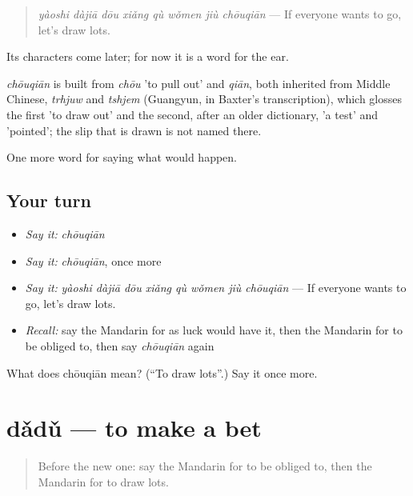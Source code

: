 \begin{quote}
\emph{yàoshi dàjiā dōu xiǎng qù wǒmen jiù chōuqiān} — If everyone wants to go, let's draw lots.
\end{quote}

Its characters come later; for now it is a word for the ear.

\begin{cousinweb}
\emph{chōuqiān} is built from \emph{chōu} 'to pull out' and \emph{qiān}, both inherited from Middle Chinese, \emph{trhjuw} and \emph{tshjem} (Guangyun, in Baxter's transcription), which glosses the first 'to draw out' and the second, after an older dictionary, 'a test' and 'pointed'; the slip that is drawn is not named there.
\end{cousinweb}

\begin{grammarlens}[title={What you've built}]
One more word for saying what would happen.
\end{grammarlens}

\subsection*{Your turn}
\begin{itemize}
\raggedright
  \item \emph{Say it:} \emph{chōuqiān}
  \item \emph{Say it:} \emph{chōuqiān}, once more
  \item \emph{Say it:} \emph{yàoshi dàjiā dōu xiǎng qù wǒmen jiù chōuqiān} — If everyone wants to go, let's draw lots.
  \item \emph{Recall:} say the Mandarin for as luck would have it, then the Mandarin for to be obliged to, then say \emph{chōuqiān} again
\end{itemize}

\begin{tcolorbox}[breakable,colback=teal!4,colframe=teal!35!black,title={Before you move on}]
What does chōuqiān mean? (\textquotedblleft{}To draw lots\textquotedblright{}.) Say it once more.
\end{tcolorbox}
\section[dǎdǔ]{dǎdǔ — to make a bet}

\label{lesson:ZH-C528-dadu}



\begin{quote}
Before the new one: say the Mandarin for to be obliged to, then the Mandarin for to draw lots.
\end{quote}

